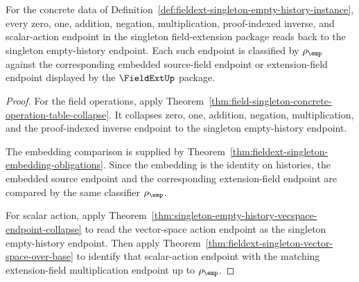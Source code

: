 \begin{theorem}
\label{thm:fieldext-singleton-operation-readback-exactness}
For the concrete data of
Definition~\ref{def:fieldext-singleton-empty-history-instance}, every zero, one,
addition, negation, multiplication, proof-indexed inverse, and scalar-action
endpoint in the singleton field-extension package reads back to the singleton
empty-history endpoint. Each such endpoint is classified by $\rho_{\emp}$
against the corresponding embedded source-field endpoint or extension-field
endpoint displayed by the $\FieldExtUp$ package.
\end{theorem}
\begin{proof}
For the field operations, apply
Theorem~\ref{thm:field-singleton-concrete-operation-table-collapse}. It
collapses zero, one, addition, negation, multiplication, and the
proof-indexed inverse endpoint to the singleton empty-history endpoint.

The embedding comparison is supplied by
Theorem~\ref{thm:fieldext-singleton-embedding-obligations}. Since the embedding is
the identity on histories, the embedded source endpoint and the corresponding
extension-field endpoint are compared by the same classifier
$\rho_{\emp}$.

For scalar action, apply
Theorem~\ref{thm:singleton-empty-history-vecspace-endpoint-collapse} to read
the vector-space action endpoint as the singleton empty-history endpoint.
Then apply
Theorem~\ref{thm:fieldext-singleton-vector-space-over-base} to identify
that scalar-action endpoint with the matching extension-field multiplication
endpoint up to $\rho_{\emp}$.
\end{proof}

